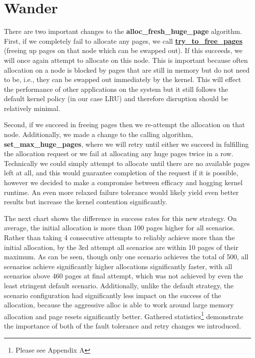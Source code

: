 \documentclass{article}
\begin{document}
\section{Wander}
There are two important changes to the \textbf{alloc\_fresh\_huge\_page} algorithm. First, if we completely fail to allocate any pages, we call \href{http://lxr.free-electrons.com/source/mm/vmscan.c?v=3.10#L2358}{\textbf{try\_to\_free\_pages}} (freeing up pages on that node which can be swapped out). If this succeeds, we will once again attempt to allocate on this node. This is important because often allocation on a node is blocked by pages that are still in memory but do not need to be, i.e., they can be swapped out immediately by the kernel. This will effect the performance of other applications on the system but it still follows the default kernel policy (in our case LRU) and therefore disruption should be relatively minimal.

\begin{figure}[H]

\label{figure:Aggressive alloc_fresh_huge_page}
\end{figure}

Second, if we succeed in freeing pages then we re-attempt the allocation on that node. Additionally, we made a change to the calling algorithm, \textbf{set\_max\_huge\_pages}, where we will retry until either we succeed in fulfilling the allocation request or we fail at allocating any huge pages twice in a row. Technically we could simply attempt to allocate until there are no available pages left at all, and this would guarantee completion of the request if it is possible, however we decided to make a compromise between efficacy and hogging kernel runtime. An even more relaxed failure tolerance would likely yield even better results but increase the kernel contention significantly.

\begin{figure}[H]

\label{figure:Aggressive alloc_fresh_huge_page}
\end{figure}

The next chart shows the difference in success rates for this new strategy. On average, the initial allocation is more than 100 pages higher for all scenarios. Rather than taking 4 consecutive attempts to reliably achieve more than the initial allocation, by the 3rd attempt all scenarios are within 10 pages of their maximum. As can be seen, though only one scenario achieves the total of 500, all scenarios achieve significantly higher allocations significantly faster, with all scenarios above 460 pages at final attempt, which was not achieved by even the least stringent default scenario. Additionally, unlike the default strategy, the scenario configuration had significantly less impact on the success of the allocation, because the aggressive alloc is able to work around large memory allocation and page resets significantly better.  Gathered statistics\footnote{Please see Appendix A} demonstrate the importance of both of the fault tolerance and retry changes we introduced.
\end{document}
